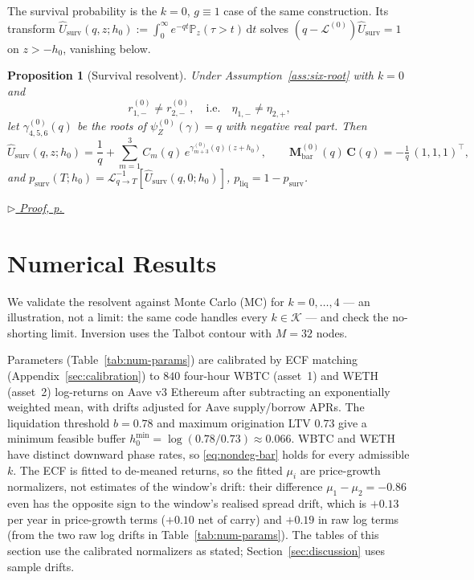 \documentclass[11pt]{article}
\newcommand{\proofref}[1]{%
  \par\noindent\hfill{\small\itshape\hyperref[#1]{$\triangleright$ Proof, p.\,\pageref{#1}}}}
\renewcommand{\P}{\mathbb{P}}
\newcommand{\diff}{\mathrm{d}}
\theoremstyle{plain}
\newtheorem{proposition}[theorem]{Proposition}
\theoremstyle{definition}
\theoremstyle{remark}
\begin{document}
The survival probability is the $k=0$, $g\equiv1$ case of the same construction. Its transform
$\widehat U_{\mathrm{surv}}(q,z;h_0):=\int_0^\infty e^{-qt}\P_z(\tau>t)\,\diff t$ solves
$(q-\mathcal L^{(0)})\widehat U_{\mathrm{surv}}=1$ on $z>-h_0$, vanishing below.

\begin{proposition}[Survival resolvent]\label{prop:survival}
Under Assumption~\ref{ass:six-root} with $k=0$ and
\begin{equation}\label{eq:nondeg-surv}
r_{1,-}^{(0)}\neq r_{2,-}^{(0)},
\quad\text{i.e.}\quad
\eta_{1,-}\neq\eta_{2,+},
\end{equation}
let $\gamma_{4,5,6}^{(0)}(q)$ be the roots of $\psi_Z^{(0)}(\gamma)=q$ with negative real part. Then
\[
\widehat U_{\mathrm{surv}}(q,z;h_0)
=
\frac{1}{q}
+
\sum_{m=1}^3 C_m(q)\,e^{\gamma_{m+3}^{(0)}(q)(z+h_0)},
\qquad
\mathbf{M}_{\mathrm{bar}}^{(0)}(q)\,\mathbf{C}(q)
=
-\tfrac1q\,(1,1,1)^\top,
\]
and $p_{\mathrm{surv}}(T;h_0)=\mathcal L^{-1}_{q\to T}[\widehat U_{\mathrm{surv}}(q,0;h_0)]$,
$p_{\mathrm{liq}}=1-p_{\mathrm{surv}}$.
\end{proposition}
\proofref{proof:prop:survival}

\section{Numerical Results}\label{sec:numerical}

We validate the resolvent against Monte Carlo (MC) for $k=0,\ldots,4$ --- an illustration, not a
limit: the same code handles every $k\in\mathcal K$ --- and check the no-shorting limit. Inversion
uses the Talbot contour \citep{Talbot1979} with $M=32$ nodes.

Parameters (Table~\ref{tab:num-params}) are calibrated by ECF matching
(Appendix~\ref{sec:calibration}) to $840$ four-hour WBTC (asset~1) and WETH (asset~2) log-returns on
Aave v3 Ethereum after subtracting an exponentially weighted mean, with drifts adjusted for Aave
supply/borrow APRs. The liquidation threshold $b=0.78$ and maximum origination LTV $0.73$ give a
minimum feasible buffer $h_0^{\min}=\log(0.78/0.73)\approx0.066$. WBTC and WETH have distinct
downward phase rates, so \eqref{eq:nondeg-bar} holds for every admissible $k$. The ECF is fitted to
de-meaned returns, so the fitted $\mu_i$ are price-growth normalizers, not estimates of the window's
drift: their difference $\mu_1-\mu_2=-0.86$ even has the opposite sign to the window's realised spread
drift, which is $+0.13$ per year in price-growth terms ($+0.10$ net of carry) and $+0.19$ in raw log
terms (from the two raw log drifts in Table~\ref{tab:num-params}). The tables of this section use the calibrated
normalizers as stated; Section~\ref{sec:discussion} uses sample drifts.
\end{document}
